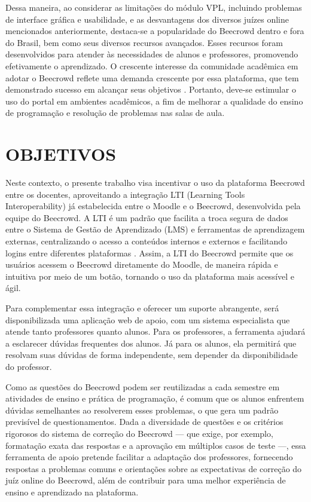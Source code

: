 Dessa maneira, ao considerar as limitações do módulo VPL, incluindo problemas de interface gráfica e usabilidade, e as desvantagens dos diversos juízes online mencionados anteriormente, destaca-se a popularidade do Beecrowd dentro e fora do Brasil, bem como seus diversos recursos avançados. Esses recursos foram desenvolvidos para atender às necessidades de alunos e professores, promovendo efetivamente o aprendizado. O crescente interesse da comunidade acadêmica em adotar o Beecrowd reflete uma demanda crescente por essa plataforma, que tem demonstrado sucesso em alcançar seus objetivos \cite[p.~31]{ferreira2022}. Portanto, deve-se estimular o uso do portal em ambientes acadêmicos, a fim de melhorar a qualidade do ensino de programação e resolução de problemas nas salas de aula.

\section{OBJETIVOS}

Neste contexto, o presente trabalho visa incentivar o uso da plataforma Beecrowd entre os docentes, aproveitando a integração LTI (Learning Tools Interoperability) já estabelecida entre o Moodle e o Beecrowd, desenvolvida pela equipe do Beecrowd. A LTI é um padrão que facilita a troca segura de dados entre o Sistema de Gestão de Aprendizado (LMS) e ferramentas de aprendizagem externas, centralizando o acesso a conteúdos internos e externos e facilitando logins entre diferentes plataformas \cite{verdaguer}. Assim, a LTI do Beecrowd permite que os usuários acessem o Beecrowd diretamente do Moodle, de maneira rápida e intuitiva por meio de um botão, tornando o uso da plataforma mais acessível e ágil.

Para complementar essa integração e oferecer um suporte abrangente, será disponibilizada uma aplicação web de apoio, com um sistema especialista que atende tanto professores quanto alunos. Para os professores, a ferramenta ajudará a esclarecer dúvidas frequentes dos alunos. Já para os alunos, ela permitirá que resolvam suas dúvidas de forma independente, sem depender da disponibilidade do professor.

Como as questões do Beecrowd podem ser reutilizadas a cada semestre em atividades de ensino e prática de programação, é comum que os alunos enfrentem dúvidas semelhantes ao resolverem esses problemas, o que gera um padrão previsível de questionamentos. Dada a diversidade de questões e os critérios rigorosos do sistema de correção do Beecrowd — que exige, por exemplo, formatação exata das respostas e a aprovação em múltiplos casos de teste —, essa ferramenta de apoio pretende facilitar a adaptação dos professores, fornecendo respostas a problemas comuns e orientações sobre as expectativas de correção do juíz online do Beecrowd, além de contribuir para uma melhor experiência de ensino e aprendizado na plataforma.

